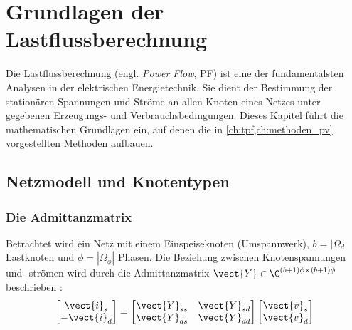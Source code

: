 \chapter{Grundlagen der Lastflussberechnung}
\label{ch:grundlagen}

Die Lastflussberechnung (engl. \textit{Power Flow}, PF) ist eine der fundamentalsten Analysen in der elektrischen Energietechnik. Sie dient der Bestimmung der stationären Spannungen und Ströme an allen Knoten eines Netzes unter gegebenen Erzeugungs- und Verbrauchsbedingungen. Dieses Kapitel führt die mathematischen Grundlagen ein, auf denen die in \cref{ch:tpf,ch:methoden_pv} vorgestellten Methoden aufbauen.

\section{Netzmodell und Knotentypen}
\label{sec:netzmodell}

\subsection{Die Admittanzmatrix}
\label{subsec:admittanzmatrix}

Betrachtet wird ein Netz mit einem Einspeiseknoten (Umspannwerk), $b = |\Omega_d|$ Lastknoten und $\phi = |\Omega_\phi|$ Phasen. Die Beziehung zwischen Knotenspannungen und -strömen wird durch die Admittanzmatrix $\vect{Y} \in \C^{(b+1)\phi \times (b+1)\phi}$ beschrieben \cite{Salazar2024}:
\begin{equation}
	\begin{bmatrix}
		\vect{i}_s \\
		-\vect{i}_d
	\end{bmatrix}
	=
	\begin{bmatrix}
		\vect{Y}_{ss} & \vect{Y}_{sd} \\
		\vect{Y}_{ds} & \vect{Y}_{dd}
	\end{bmatrix}
	\begin{bmatrix}
		\vect{v}_s \\
		\vect{v}_d
	\end{bmatrix}
	\label{eq:admittanz_system}
\end{equation}

